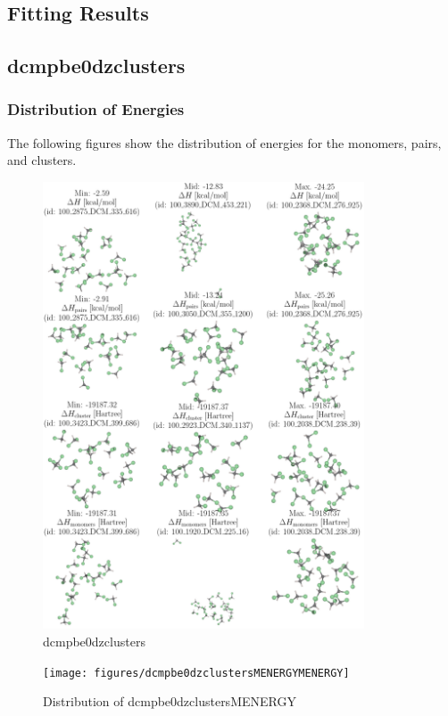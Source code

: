 \documentclass[journal=jacsat,manuscript=article]{achemso}
\begin{document}
 \subsection{Fitting Results}
\subsection{dcmpbe0dzclusters}
\subsubsection{Distribution of Energies} 
 The following figures show the distribution of energies for the monomers, pairs, and clusters.

\begin{figure}
    \centering
    \includegraphics[width=0.85\textwidth]{figures/dcmpbe0dzclustersmols}
    \caption{ dcmpbe0dzclusters }
    \label{fig:dcmpbe0dzclustersmols}
\end{figure}

\begin{figure}
    \centering
    \texttt{[image: figures/dcmpbe0dzclustersMENERGYMENERGY]}
    \caption{ Distribution of dcmpbe0dzclustersMENERGY }
    \label{fig:dcmpbe0dzclusterssinglekey}
\end{figure}
\end{document}
